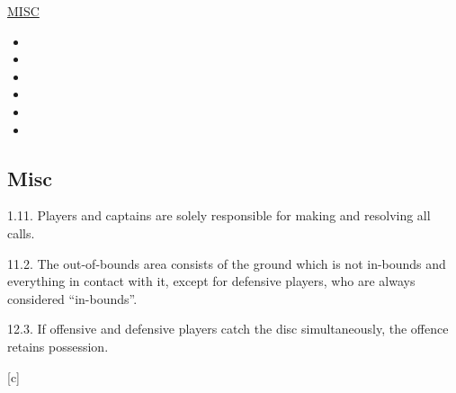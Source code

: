 \underline{\uppercase{Misc}}

\begin{itemize}
13.10. If the turnover location is in the offence’s attacking end zone, the thrower must establish a pivot point at the nearest location on the goal line.

13.11. If the turnover location is in the offence’s defending end zone, the thrower may choose where to
establish a pivot point:
13.11.1. at the turnover location, by staying at the turnover location or faking a pass; or
13.11.2. at the nearest location on the goal line to the turnover location, by moving from the turnover
location.
13.11.2.1. The intended thrower, before picking up the disc, may signal the goal line option by fully
extending one arm above their head.
13.11.3. Immediate movement, staying at the turnover location, faking a pass, or signaling the goal line
option, determines where to establish a pivot point and cannot be reversed.

    \item
    \item
    \item
    \item
    \item
    \item
\end{itemize}


\subsection*{Misc}

\begin{itemize}
1.11. Players and captains are solely responsible for making and resolving all calls.

11.2. The out-of-bounds area consists of the ground which is not in-bounds and everything in contact with it,
except for defensive players, who are always considered “in-bounds”.

12.3. If offensive and defensive players catch the disc simultaneously, the offence retains possession.
\end{itemize}

\begin{center}[c]\end{center}
